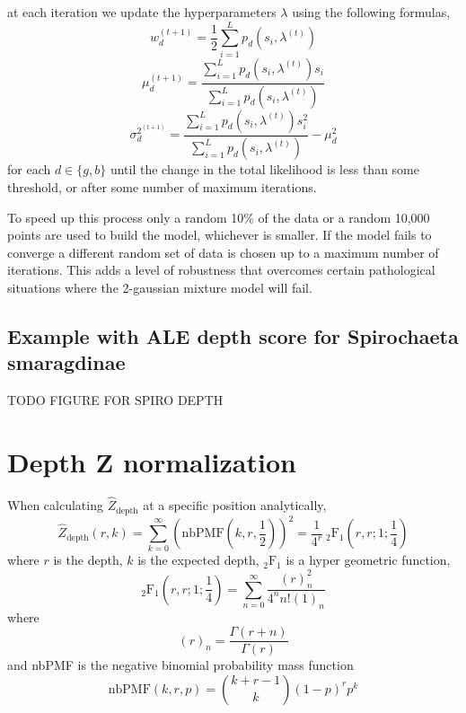 \documentclass[phd,tocprelim]{cornell}
\begin{document}
at each iteration we update the hyperparameters $\lambda$ using the following formulas,
\begin{equation}
    w_{d}^{(t+1)} = \frac{1}{2}\sum_{i=1}^{L} p_{d}(s_{i}, \lambda^{(t)})
\end{equation}
\begin{equation}
    \mu_{d}^{(t+1)} = \frac{\sum_{i=1}^{L} p_{d}(s_{i}, \lambda^{(t)}) s_{i}}{\sum_{i=1}^{L} p_{d}(s_{i}, \lambda^{(t)})}
\end{equation}
\begin{equation}
    \sigma_{d}^{2^{(t+1)}} = \frac{\sum_{i=1}^{L} p_{d}(s_{i}, \lambda^{(t)}) s_{i}^{2}}{\sum_{i=1}^{L} p_{d}(s_{i}, \lambda^{(t)})} - \mu_{d}^{2}
\end{equation}
for each $d \in \{g, b\}$ until the change in the total likelihood is less than some threshold, or after some number of maximum iterations.

To speed up this process only a random 10\% of the data or a random 10,000 points are used to build the model, whichever is smaller. If the model fails to converge a different random set of data is chosen up to a maximum number of iterations. This adds a level of robustness that overcomes certain pathological situations where the 2-gaussian mixture model will fail.

\subsection{Example with ALE depth score for Spirochaeta smaragdinae}

TODO
FIGURE FOR SPIRO DEPTH

\section{Depth Z normalization} %
\label{sec:Depth Z normalization}

When calculating $\hat{Z}_{\text{depth}}$ at a specific position analytically,
\begin{equation}
    \hat{Z}_{\text{depth}}(r,k) = \sum_{k=0}^{\infty} \left(\mbox{nbPMF}\left(k,r,\frac{1}{2}\right)\right)^{2} = \frac{1}{4^{r}} \ _{2}\mbox{F}_{1}\left(r,r;1;\frac{1}{4}\right)
\end{equation}
where $r$ is the depth, $k$ is the expected depth, $_{2}\mbox{F}_{1}$ is a hyper geometric function,
\begin{equation}
    _{2}\mbox{F}_{1}\left(r,r;1;\frac{1}{4}\right) = \sum_{n=0}^{\infty} \frac{(r)^{2}_{n}}{4^{n}n!(1)_{n}}
\end{equation}
where
\begin{equation}
    (r)_{n} = \frac{\Gamma(r+n)}{\Gamma(r)}    
\end{equation}
and nbPMF is the negative binomial probability mass function
\begin{equation}
    \mbox{nbPMF}\left(k,r,p\right) = {k+r-1 \choose k} (1-p)^{r}p^{k}
\end{equation}
\end{document}
